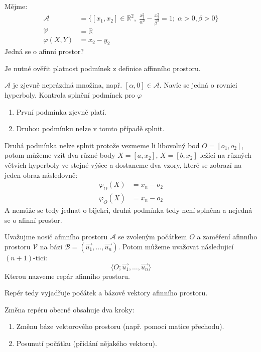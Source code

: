 \begin{example}
    Mějme:
    \begin{align*}
        \mathcal{A} &= \{[x_1, x_2] \in \mathbb{R}^2, \; \frac{x_1^2}{\alpha^2} -
        \frac{x_2^2}{\beta^2} = 1; \; \alpha > 0, \beta > 0 \}\\
        \mathcal{V} &= \mathbb{R}\\
        \varphi(X, Y) &= x_2 - y_2
    \end{align*}
    Jedná se o afinní prostor?


    Je nutné ověřit platnost podmínek z definice affinního prostoru.

    $\mathcal{A}$ je zjevně neprázdná množina, např. $[\alpha, 0] \in \mathcal{A}$.
    Navíc se jedná o rovnici hyperboly.
    Kontrola splnění podmínek pro $\varphi$
    \begin{enumerate}
        \item První podmínka zjevně platí.
        \item Druhou podmínku nelze v tomto případě splnit.
    \end{enumerate}
    Druhá podmínka nelze splnit protože vezmeme li libovolný bod $O = [o_1, o_2]$,
    potom můžeme vzít dva různé body $X = [a, x_2],\, \overline{X} = [b, x_2]$ ležící
    na různých větvích hyperboly ve stejné výšce a dostaneme dva vzory, které se zobrazí
    na jeden obraz následovně:
    \begin{align*}
        \varphi_O(X) &= x_n - o_2\\
        \varphi_O(\overline{X}) &= x_n - o_2
    \end{align*}
    A nemůže se tedy jednat o bijekci, druhá podmínka tedy není splněna a
    nejedná se o afinní prostor.
\end{example}

\begin{definition}
    Uvažujme nosič afinního prostoru $\mathcal{A}$ se zvoleným počátkem $O$ a zaměření
    afinního prostoru $\mathcal{V}$ na bázi $\mathcal{B} = (\vec{u_1},
    \ldots, \vec{u_n})$.
    Potom můžeme uvažovat následujicí $(n + 1)$-tici:
    $$\langle O; \vec{u_1}, \ldots, \vec{u_n} \rangle$$
    Kterou nazveme repár afinního prostoru.

    Repér tedy vyjadřuje počátek a bázové vektory afinního prostoru.

    Změna repéru obecně obsahuje dva kroky:
    \begin{enumerate}
        \item Změnu báze vektorového prostoru (např. pomocí matice přechodu).
        \item Posunutí počátku (přidání nějakého vektoru).
    \end{enumerate}
\end{definition}

